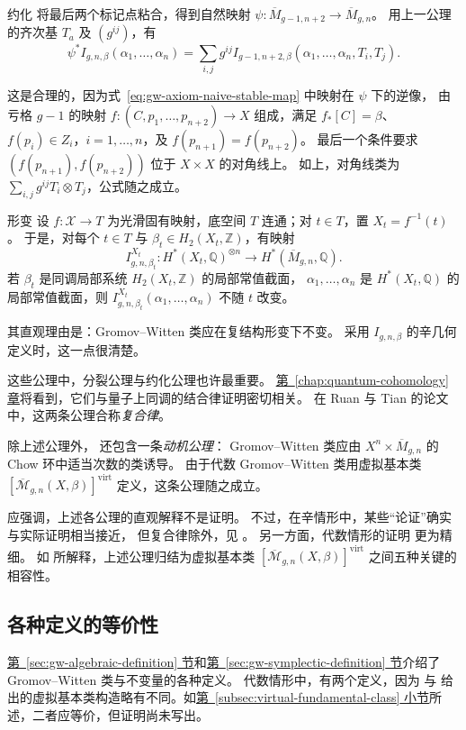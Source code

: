 \begin{axiom*}{约化}
将最后两个标记点粘合，得到自然映射
$\psi:\overline M_{g-1,n+2}\to\overline M_{g,n}$。
用上一公理的齐次基 $T_a$ 及 $(g^{ij})$，有
\[
\psi^*I_{g,n,\beta}(\alpha_1,\ldots,\alpha_n)
=\sum_{i,j}g^{ij}I_{g-1,n+2,\beta}(\alpha_1,\ldots,\alpha_n,T_i,T_j).
\]
\end{axiom*}
这是合理的，因为式~\eqref{eq:gw-axiom-naive-stable-map} 中映射在 $\psi$ 下的逆像，
由亏格 $g-1$ 的映射 $f:(C,p_1,\ldots,p_{n+2})\to X$ 组成，满足
$f_*[C]=\beta$、$f(p_i)\in Z_i$，$i=1,\ldots,n$，及 $f(p_{n+1})=f(p_{n+2})$。
最后一个条件要求 $(f(p_{n+1}),f(p_{n+2}))$ 位于 $X\times X$ 的对角线上。
如上，对角线类为 $\sum_{i,j}g^{ij}T_i\otimes T_j$，公式随之成立。

\begin{axiom*}{形变}
设 $f:\mathcal X\to T$ 为光滑固有映射，底空间 $T$ 连通；对 $t\in T$，置 $X_t=f^{-1}(t)$。
于是，对每个 $t\in T$ 与 $\beta_t\in H_2(X_t,\mathbb Z)$，有映射
\[
I^{X_t}_{g,n,\beta_t}:H^*(X_t,\mathbb Q)^{\otimes n}
\longrightarrow H^*(\overline M_{g,n},\mathbb Q).
\]
若 $\beta_t$ 是同调局部系统 $H_2(X_t,\mathbb Z)$ 的局部常值截面，
$\alpha_1,\ldots,\alpha_n$ 是 $H^*(X_t,\mathbb Q)$ 的局部常值截面，则
$I^{X_t}_{g,n,\beta_t}(\alpha_1,\ldots,\alpha_n)$ 不随 $t$ 改变。
\end{axiom*}
其直观理由是：Gromov--Witten 类应在复结构形变下不变。
采用 $I_{g,n,\beta}$ 的辛几何定义时，这一点很清楚。

这些公理中，分裂公理与约化公理也许最重要。
\hyperref[chap:quantum-cohomology]{第~\ref*{chap:quantum-cohomology} 章}将看到，它们与量子上同调的结合律证明密切相关。
在 Ruan 与 Tian 的论文中，这两条公理合称\emph{复合律}。

除上述公理外， 还包含一条\emph{动机公理}：
Gromov--Witten 类应由
$X^n\times\overline M_{g,n}$ 的 Chow 环中适当次数的类诱导。
由于代数 Gromov--Witten 类用虚拟基本类
$[\overline{\mathcal M}_{g,n}(X,\beta)]^{\mathrm{virt}}$ 定义，这条公理随之成立。

应强调，上述各公理的直观解释不是证明。
不过，在辛情形中，某些“论证”确实与实际证明相当接近，
但复合律除外，见 。
另一方面，代数情形的证明  更为精细。
如  所解释，上述公理归结为虚拟基本类
$[\overline{\mathcal M}_{g,n}(X,\beta)]^{\mathrm{virt}}$ 之间五种关键的相容性。

\subsection{各种定义的等价性}\label{subsec:gw-equivalence}
\hyperref[sec:gw-algebraic-definition]{第~\ref*{sec:gw-algebraic-definition} 节}和\hyperref[sec:gw-symplectic-definition]{第~\ref*{sec:gw-symplectic-definition} 节}介绍了 Gromov--Witten 类与不变量的各种定义。
代数情形中，有两个定义，因为  与 
给出的虚拟基本类构造略有不同。如\hyperref[subsec:virtual-fundamental-class]{第~\ref*{subsec:virtual-fundamental-class} 小节}所述，二者应等价，但证明尚未写出。

